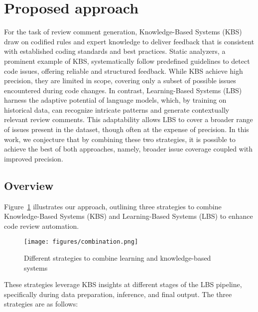 \section{Proposed approach}
\label{sec:approach}

For the task of review comment generation, Knowledge-Based Systems (KBS) draw on codified rules and expert knowledge to deliver feedback that is consistent with established coding standards and best practices. Static analyzers, a prominent example of KBS, systematically follow predefined guidelines to detect code issues, offering reliable and structured feedback. While KBS achieve high precision, they are limited in scope, covering only a subset of possible issues encountered during code changes. In contrast, Learning-Based Systems (LBS) harness the adaptive potential of language models, which, by training on historical data, can recognize intricate patterns and generate contextually relevant review comments. This adaptability allows LBS to cover a broader range of issues present in the dataset, though often at the expense of precision. In this work, we conjecture that by combining these two strategies, it is possible to achieve the best of both approaches, namely, broader issue coverage coupled with improved precision.

\subsection{Overview}

Figure~\ref{fig:combination} illustrates our approach, outlining three strategies to combine Knowledge-Based Systems (KBS) and Learning-Based Systems (LBS) to enhance code review automation. 

\begin{figure}[htbp!]
  \centering
  \texttt{[image: figures/combination.png]}
  \caption{Different strategies to combine learning and knowledge-based systems}
  \label{fig:combination} 
\end{figure}

These strategies leverage KBS insights at different stages of the LBS pipeline, specifically during data preparation, inference, and final output. The three strategies are as follows:

